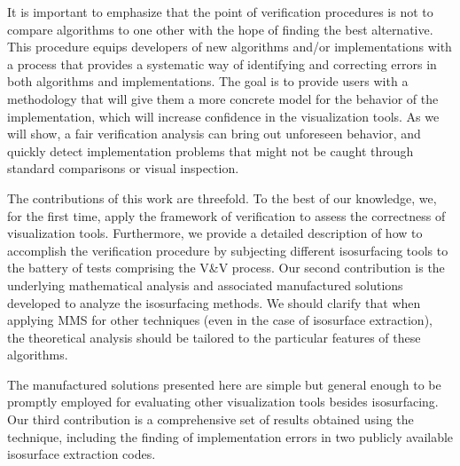 It is important to emphasize that the point of verification procedures
is not to compare algorithms to one other with
the hope of finding the best alternative.
This procedure equips developers of new algorithms and/or 
implementations with a process that provides a systematic way 
of identifying and correcting errors in both algorithms and implementations.
The goal is to provide users with a methodology that will give them a
more concrete model for the behavior of the implementation, which will
increase confidence in the visualization tools. 
As we will show, a fair verification analysis can 
bring out unforeseen behavior, and quickly detect implementation problems that
might not be caught through standard comparisons or visual inspection.

The contributions of this work are threefold. To the best of our
knowledge, we, for the first time, apply the framework of 
verification to assess the correctness of visualization tools.
Furthermore, we provide a detailed description of how to accomplish the 
verification procedure by subjecting different isosurfacing tools 
to the battery of tests comprising the V\&V process. 
Our second contribution is the underlying mathematical analysis and associated 
manufactured solutions developed to analyze the isosurfacing methods.
We should clarify that when applying MMS for other techniques (even in
the case of isosurface extraction), the theoretical analysis should be
tailored to the particular features of these algorithms.

The manufactured solutions presented here are simple but
general enough to be promptly employed for evaluating other 
visualization tools besides isosurfacing.
Our third contribution is a comprehensive set of results obtained
using the technique, including the finding of implementation errors in
two publicly available isosurface extraction codes.
